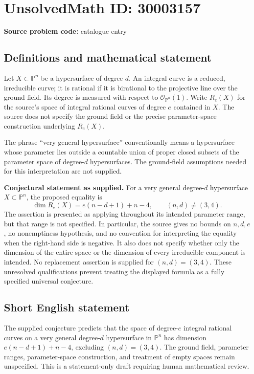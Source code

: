 \documentclass[11pt]{article}
\newcommand{\PP}{\mathbb{P}}
\begin{document}
\section*{UnsolvedMath ID: 30003157}
\textbf{Source problem code:} catalogue entry
\subsection{Definitions and mathematical statement}
Let \(X\subset\PP^n\) be a hypersurface of degree \(d\). An integral curve is a reduced, irreducible curve; it is rational if it is birational to the projective line over the ground field. Its degree is measured with respect to \(\mathcal O_{\PP^n}(1)\). Write \(R_e(X)\) for the source's space of integral rational curves of degree \(e\) contained in \(X\). The source does not specify the ground field or the precise parameter-space construction underlying \(R_e(X)\).

The phrase ``very general hypersurface'' conventionally means a hypersurface whose parameter lies outside a countable union of proper closed subsets of the parameter space of degree-\(d\) hypersurfaces. The ground-field assumptions needed for this interpretation are not supplied.

\textbf{Conjectural statement as supplied.} For a very general degree-\(d\) hypersurface \(X\subset\PP^n\), the proposed equality is
\[
\dim R_e(X)=e(n-d+1)+n-4,
\qquad (n,d)\ne(3,4).
\]
The assertion is presented as applying throughout its intended parameter range, but that range is not specified. In particular, the source gives no bounds on \(n,d,e\), no nonemptiness hypothesis, and no convention for interpreting the equality when the right-hand side is negative. It also does not specify whether only the dimension of the entire space or the dimension of every irreducible component is intended. No replacement assertion is supplied for \((n,d)=(3,4)\). These unresolved qualifications prevent treating the displayed formula as a fully specified universal conjecture.
\subsection{Short English statement}
The supplied conjecture predicts that the space of degree-\(e\) integral rational curves on a very general degree-\(d\) hypersurface in \(\PP^n\) has dimension \(e(n-d+1)+n-4\), excluding \((n,d)=(3,4)\). The ground field, parameter ranges, parameter-space construction, and treatment of empty spaces remain unspecified. This is a statement-only draft requiring human mathematical review.
\end{document}

